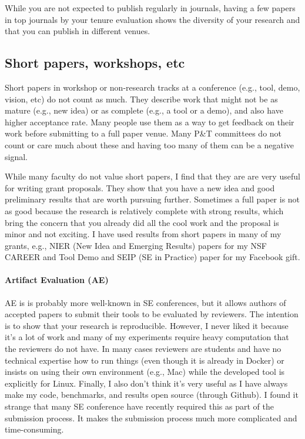 \documentclass[oneside,11pt,dvipsnames]{book}
\begin{document}
While you are not expected to publish regularly in journals, having a few papers in top journals by your tenure evaluation shows the diversity of your research and that you can publish in different venues.



\subsection{Short papers, workshops, etc} Short papers in workshop or non-research tracks at a conference (e.g., tool, demo, vision, etc) do not count as much.
They describe work that might not be as mature (e.g., new idea) or as complete (e.g., a tool or a demo), and also have higher acceptance rate. Many people use them as a way to get feedback on their work before submitting to a full paper venue.  Many P\&T committees do not count or care much about these and having too many of them can be a negative signal.

While many faculty do not value short papers, I find that they are are very useful for writing grant proposals. They show that you have a new idea and good preliminary results that are worth pursuing further. Sometimes a full paper is not as good because the research is relatively complete with strong results, which bring the concern that you already did all the cool work and the proposal is minor and not exciting.
I have used results from short papers in many of my grants, e.g., NIER (New Idea and Emerging Results) papers for my NSF CAREER and Tool Demo and SEIP (SE in Practice) paper for my Facebook gift.

\paragraph{Artifact Evaluation (AE)} AE is is probably more well-known in SE conferences, but it allows authors of accepted papers to submit their tools to be evaluated by reviewers. The intention is to show that your research is reproducible. However, I never liked it because it's a lot of work and many of my experiments require heavy computation that the reviewers do not have. In many cases reviewers are students and have no technical expertise how to run things (even though it is already in Docker) or insists on using their own environment (e.g., Mac) while the developed tool is explicitly for Linux.
Finally, I also don't think it's very useful as I have always make my code, benchmarks, and results open source (through Github). I found it strange that many SE conference have recently required this as part of the submission process. It makes the submission process much more complicated and time-consuming.
\end{document}
